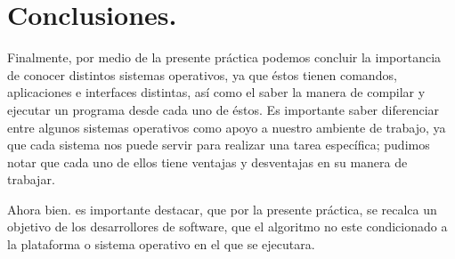 \documentclass[12pt]{article}
\begin{document}
\section{Conclusiones.}

Finalmente, por medio de la presente  práctica podemos concluir la importancia de conocer distintos sistemas operativos, ya que éstos tienen comandos, aplicaciones e interfaces distintas, así como el saber la manera de compilar y ejecutar un programa desde cada uno de éstos. Es importante saber diferenciar entre algunos sistemas operativos como apoyo a nuestro ambiente de trabajo, ya que cada sistema nos puede servir para realizar una tarea específica; pudimos notar que cada uno de ellos tiene ventajas y desventajas en su manera de trabajar.

Ahora bien. es importante destacar, que por la presente práctica, se recalca un objetivo de los desarrollores de software, que el algoritmo no este condicionado a la plataforma o sistema operativo en el que se ejecutara.
\end{document}
